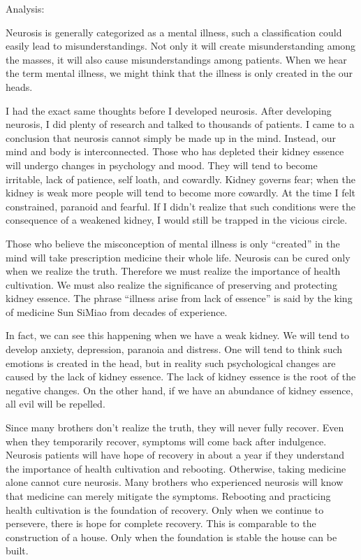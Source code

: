 \documentclass[
]{book}
\begin{document}
Analysis:

Neurosis is generally categorized as a mental illness, such a classification could easily lead to misunderstandings. Not only it will create misunderstanding among the masses, it will also cause misunderstandings among patients. When we hear the term mental illness, we might think that the illness is only created in the our heads.

I had the exact same thoughts before I developed neurosis. After developing neurosis, I did plenty of research and talked to thousands of patients. I came to a conclusion that neurosis cannot simply be made up in the mind. Instead, our mind and body is interconnected. Those who has depleted their kidney essence will undergo changes in psychology and mood. They will tend to become irritable, lack of patience, self loath, and cowardly. Kidney governs fear; when the kidney is weak more people will tend to become more cowardly. At the time I felt constrained, paranoid and fearful. If I didn't realize that such conditions were the consequence of a weakened kidney, I would still be trapped in the vicious circle.

Those who believe the misconception of mental illness is only ``created'' in the mind will take prescription medicine their whole life. Neurosis can be cured only when we realize the truth. Therefore we must realize the importance of health cultivation. We must also realize the significance of preserving and protecting kidney essence. The phrase ``illness arise from lack of essence'' is said by the king of medicine Sun SiMiao from decades of experience.

In fact, we can see this happening when we have a weak kidney. We will tend to develop anxiety, depression, paranoia and distress. One will tend to think such emotions is created in the head, but in reality such psychological changes are caused by the lack of kidney essence. The lack of kidney essence is the root of the negative changes. On the other hand, if we have an abundance of kidney essence, all evil will be repelled.

Since many brothers don't realize the truth, they will never fully recover. Even when they temporarily recover, symptoms will come back after indulgence. Neurosis patients will have hope of recovery in about a year if they understand the importance of health cultivation and rebooting. Otherwise, taking medicine alone cannot cure neurosis. Many brothers who experienced neurosis will know that medicine can merely mitigate the symptoms. Rebooting and practicing health cultivation is the foundation of recovery. Only when we continue to persevere, there is hope for complete recovery. This is comparable to the construction of a house. Only when the foundation is stable the house can be built.
\end{document}
